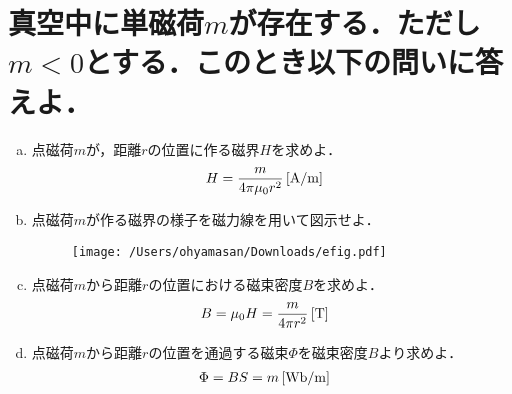\documentclass[dvipdfmx]{ujarticle}
\begin{document}
\section{真空中に単磁荷$m$が存在する．ただし$m<0$とする．このとき以下の問いに答えよ．}
\begin{enumerate}[(a)]
	\item 点磁荷$m$が，距離$r$の位置に作る磁界$H$を求めよ．
	\begin{align*}
		H&=\frac{m}{4 \pi \mu_{0} r^{2}}\,[\rm{A/m}]
	\end{align*}
	\item 点磁荷$m$が作る磁界の様子を磁力線を用いて図示せよ．
	\begin{figure}[h]
	\centering
	\texttt{[image: /Users/ohyamasan/Downloads/efig.pdf]}
	\end{figure}
	\item 点磁荷$m$から距離$r$の位置における磁束密度$B$を求めよ．
	\begin{align*}
		B&=\mu_{0} H=\frac{m}{4 \pi r^{2}}\,[\rm{T}]
	\end{align*}
	\item 点磁荷$m$から距離$r$の位置を通過する磁束$\Phi$を磁束密度$B$より求めよ．
	\begin{align*}
		\Phi&=BS=m\,[\rm{Wb/m}]
	\end{align*}
\end{enumerate}
\end{document}
